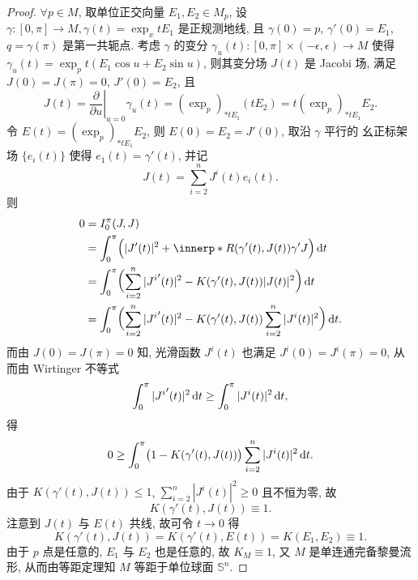 \begin{proof}
  $\forall p\in M$, 取单位正交向量 $E_1,E_2\in M_p$,
  设 $\gamma\colon [0,\pi]\to M, \gamma(t)=\exp_x tE_1$ 是正规测地线, 且 $\gamma(0)=p$, $\gamma'(0)=E_1$,
  $q=\gamma(\pi)$ 是第一共轭点. 考虑 $\gamma$ 的变分 $\gamma_u(t)\colon [0,\pi]\times(-\epsilon,\epsilon)\to M$
  使得 $\gamma_u(t)=\exp_p t(E_1\cos u+E_2\sin u)$, 则其变分场 $J(t)$ 是 Jacobi 场,
  满足 $J(0)=J(\pi)=0$, $J'(0)=E_2$, 且
  \[J(t) = \left.\frac{\partial}{\partial u}\right|_{u=0}
    \gamma_u(t) = (\exp_p)_{*tE_1}(tE_2) = t(\exp_p)_{*tE_1} E_2.\]
  令 $E(t)=(\exp_p)_{*tE_1} E_2$, 则 $E(0)=E_2=J'(0)$, 取沿 $\gamma$ 平行的
  幺正标架场 $\{e_i(t)\}$ 使得 $e_1(t)=\gamma'(t)$, 并记
  \[J(t) = \sum_{i=2}^n J^i(t)e_i(t).\]
  则
  \begin{align*}
    0
    & = I_0^{\pi} (J,J) \\
    & = \int_0^{\pi} \Bigl(|J'(t)|^2 + \innerp*{R(\gamma'(t),J(t))\gamma'}{J}\Bigr)\diff t \\
    & = \int_0^{\pi} \biggl(\sum_{i=2}^n |{J^i}'(t)|^2 - K(\gamma'(t), J(t))|J(t)|^2\biggr)\diff t\\
    & = \int_0^{\pi} \biggl(\sum_{i=2}^n |{J^i}'(t)|^2 - 
      K(\gamma'(t), J(t))\sum_{i=2}^n |J^i(t)|^2\biggr)\diff t.
  \end{align*}
  而由 $J(0)=J(\pi)=0$ 知, 光滑函数 $J^i(t)$ 也满足 $J^i(0)=J^i(\pi)=0$,
  从而由 Wirtinger 不等式
  \[\int_0^{\pi} |{J^i}'(t)|^2\mathop{}\!\mathrm{d} t\geq \int_0^{\pi} |J^i(t)|^2\mathop{}\!\mathrm{d} t,\]
  得
  \[0\geq \int_0^{\pi} \bigl(1-K(\gamma'(t),J(t))\bigr)\sum_{i=2}^n |J^i(t)|^2\mathop{}\!\mathrm{d} t.\]
  由于 $K(\gamma'(t),J(t))\leq 1$, $\sum_{i=2}^n |J^i(t)|^2\geq 0$ 且不恒为零, 故
  \[K(\gamma'(t), J(t))\equiv 1.\]
  注意到 $J(t)$ 与 $E(t)$ 共线, 故可令 $t\to 0$ 得
  \[K(\gamma'(t), J(t))=K(\gamma'(t), E(t)) = K(E_1,E_2)\equiv 1.\]
  由于 $p$ 点是任意的, $E_1$ 与 $E_2$ 也是任意的, 故 $K_M\equiv 1$,
  又 $M$ 是单连通完备黎曼流形, 从而由等距定理知 $M$ 等距于单位球面 $\mathbb{S}^n$.
\end{proof}